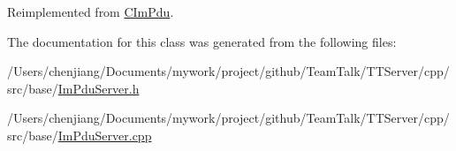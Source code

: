 Reimplemented from \hyperlink{class_c_im_pdu_a887912f445b3e864d33f9e7f2325f1fc}{C\+Im\+Pdu}.



The documentation for this class was generated from the following files\+:\begin{DoxyCompactItemize}
\item 
/\+Users/chenjiang/\+Documents/mywork/project/github/\+Team\+Talk/\+T\+T\+Server/cpp/src/base/\hyperlink{_im_pdu_server_8h}{Im\+Pdu\+Server.\+h}\item 
/\+Users/chenjiang/\+Documents/mywork/project/github/\+Team\+Talk/\+T\+T\+Server/cpp/src/base/\hyperlink{_im_pdu_server_8cpp}{Im\+Pdu\+Server.\+cpp}\end{DoxyCompactItemize}

